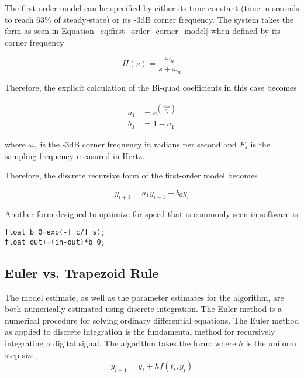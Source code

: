 The first-order model can be specified by either its time constant (time in seconds to reach 63\% of steady-state) or its -3dB corner frequency.  The system takes the form as seen in Equation~\ref{eq:first_order_corner_model} when defined by its corner frequency

\begin{equation}\label{eq:first_order_corner_model}
H(s)=\frac{\omega_n}{s+\omega_n}
\end{equation}

Therefore, the explicit calculation of the Bi-quad coefficients in this case becomes

\begin{equation}\label{eq:first_order_coeffieicnts}
\begin{split}
 a_1&=e^{\left(\frac{-\omega_n}{F_s}\right)}  \\
 b_0&=1-a_1
\end{split}
\end{equation}

where $\omega_n$ is the -3dB corner frequency in radians per second and $F_s$ is the sampling frequency measured in Hertz.

Therefore, the discrete recursive form of the first-order model becomes

\begin{equation}
y_{i+1}=a_1y_{i-1}+b_0y_i
\end{equation}

Another form designed to optimize for speed that is commonly seen in software is

\begin{lstlisting}
float b_0=exp(-f_c/f_s);
float out+=(in-out)*b_0;
\end{lstlisting}

\subsection{Euler vs. Trapezoid Rule}

The model estimate, as well as the parameter estimates for the \Lone algorithm, are both numerically estimated using discrete integration.  The Euler method is a numerical procedure for solving ordinary differential equations. The Euler method as applied to discrete integration is the fundamental method for recursively integrating a digital signal.  The algorithm takes the form: \newline
where $h$ is the uniform step size,
\begin{equation}
y_{i+1}=y_i+hf(t_i,y_i)
\end{equation}

